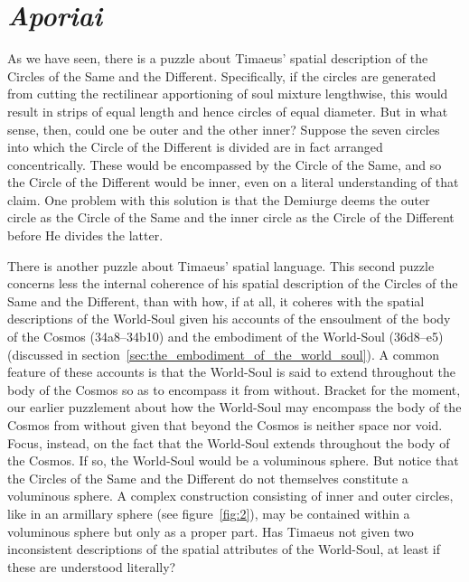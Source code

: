 \section{\emph{Aporiai}} %
\label{sec:aporiai}

As we have seen, there is a puzzle about Timaeus' spatial description of the Circles of the Same and the Different. Specifically, if the circles are generated from cutting the rectilinear apportioning of soul mixture lengthwise, this would result in strips of equal length and hence circles of equal diameter. But in what sense, then, could one be outer and the other inner? Suppose the seven circles into which the Circle of the Different is divided are in fact arranged concentrically. These would be encompassed by the Circle of the Same, and so the Circle of the Different would be inner, even on a literal understanding of that claim. One problem with this solution is that the Demiurge deems the outer circle as the Circle of the Same and the inner circle as the Circle of the Different before He divides the latter.

There is another puzzle about Timaeus' spatial language. This second puzzle concerns less the internal coherence of his spatial description of the Circles of the Same and the Different, than with how, if at all, it coheres with the spatial descriptions of the World-Soul given his accounts of the ensoulment of the body of the Cosmos (34a8--34b10) and the embodiment of the World-Soul (36d8--e5) (discussed in section~\ref{sec:the_embodiment_of_the_world_soul}). A common feature of these accounts is that the World-Soul is said to extend throughout the body of the Cosmos so as to encompass it from without. Bracket for the moment, our earlier puzzlement about how the World-Soul may encompass the body of the Cosmos from without given that beyond the Cosmos is neither space nor void. Focus, instead, on the fact that the World-Soul extends throughout the body of the Cosmos. If so, the World-Soul would be a voluminous sphere. But notice that the Circles of the Same and the Different do not themselves constitute a voluminous sphere. A complex construction consisting of inner and outer circles, like in an armillary sphere (see figure~\ref{fig:2}), may be contained within a voluminous sphere but only as a proper part. Has Timaeus not given two inconsistent descriptions of the spatial attributes of the World-Soul, at least if these are understood literally?

